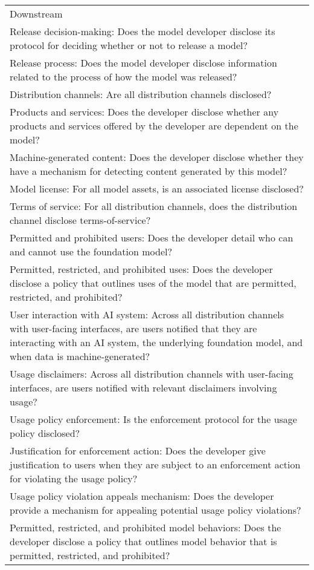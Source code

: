 \begin{table}
\centering
\tiny
\begin{tabular}{l}
Downstream \\
Release decision-making: Does the model developer disclose its protocol for deciding whether or not to release a model? \\
Release process: Does the model developer disclose information related to the process of how the model was released? \\
Distribution channels: Are all distribution channels disclosed?\\
Products and services: Does the developer disclose whether any products and services offered by the developer are dependent on the model? \\
Machine-generated content: Does the developer disclose whether they have a mechanism for detecting content generated by this model? \\
Model license: For all model assets, is an associated license disclosed?\\
Terms of service: For all distribution channels, does the distribution channel disclose terms-of-service? \\
Permitted and prohibited users: Does the developer detail who can and cannot use the foundation model?\\
Permitted, restricted, and prohibited uses: Does the developer disclose a policy that outlines uses of the model that are permitted, restricted, and prohibited?\\
User interaction with AI system: Across all distribution channels with user-facing interfaces, are users notified that they are interacting with an AI system, the underlying foundation model, and when data is machine-generated? \\
Usage disclaimers: Across all distribution channels with user-facing interfaces, are users notified with relevant disclaimers involving usage?\\
Usage policy enforcement: Is the enforcement protocol for the usage policy disclosed? \\
Justification for enforcement action: Does the developer give justification to users when they are subject to an enforcement action for violating the usage policy?\\
Usage policy violation appeals mechanism: Does the developer provide a mechanism for appealing potential usage policy violations? \\
Permitted, restricted, and prohibited model behaviors: Does the developer disclose a policy that outlines model behavior that is permitted, restricted, and prohibited? \\

\end{tabular}
\end{table}
